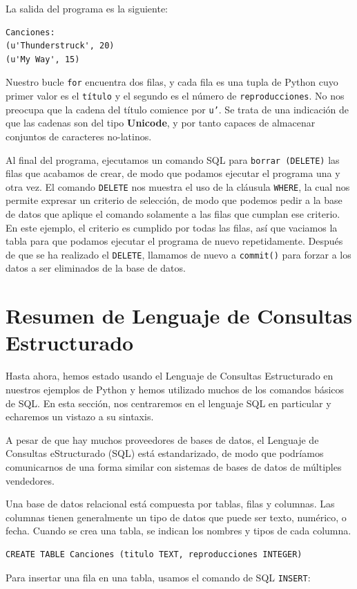 La salida del programa es la siguiente:

\beforeverb
\begin{verbatim}
Canciones:
(u'Thunderstruck', 20)
(u'My Way', 15)
\end{verbatim}
\afterverb
%
Nuestro bucle {\tt for} encuentra dos filas, y cada fila es una tupla de Python cuyo
primer valor es el {\tt título} y el segundo es el número de {\tt reproducciones}.
No nos preocupa que la cadena del título comience por
{\tt u'}. Se trata de una indicación de que las cadenas son del tipo {\bf Unicode},
y por tanto capaces de almacenar conjuntos de caracteres no-latinos.

Al final del programa, ejecutamos un comando SQL para {\tt borrar (DELETE)}
las filas que acabamos de crear, de modo que podamos ejecutar el programa una y otra vez.
El comando {\tt DELETE} nos muestra el uso de la cláusula {\tt WHERE}, la cual
nos permite expresar un criterio de selección, de modo que podemos pedir a la base de datos
que aplique el comando solamente a las filas que cumplan ese criterio. En este ejemplo,
el criterio es cumplido por todas las filas, así que vaciamos la tabla
para que podamos ejecutar el programa de nuevo repetidamente. Después de que se ha realizado el
{\tt DELETE}, llamamos de nuevo a {\tt commit()} para forzar a los datos a ser eliminados de
la base de datos.

\section{Resumen de Lenguaje de Consultas Estructurado}

Hasta ahora, hemos estado usando el Lenguaje de Consultas Estructurado en nuestros
ejemplos de Python y hemos utilizado muchos de los comandos básicos de SQL.
En esta sección, nos centraremos en el lenguaje SQL en particular
y echaremos un vistazo a su sintaxis.

A pesar de que hay muchos proveedores de bases de datos, el Lenguaje de Consultas
eStructurado (SQL) está estandarizado, de modo que podríamos comunicarnos de una forma
similar con sistemas de bases de datos de múltiples vendedores. 

Una base de datos relacional está compuesta por tablas, filas y columnas. Las columnas
tienen generalmente un tipo de datos que puede ser texto, numérico, o fecha. Cuando se crea
una tabla, se indican los nombres y tipos de cada columna.

\beforeverb
\begin{verbatim}
CREATE TABLE Canciones (titulo TEXT, reproducciones INTEGER)
\end{verbatim}
\afterverb
%
Para insertar una fila en una tabla, usamos el comando de SQL {\tt INSERT}:

